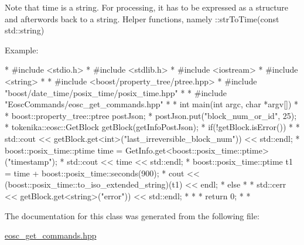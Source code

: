 Note that time is a string. For processing, it has to be expressed as a structure and afterwords back to a string. Helper functions, namely \+::str\+To\+Time(const std\+::string)

Example\+:

\begin{DoxyVerb}* #include <stdio.h>
* #include <stdlib.h>
* #include <iostream>
* #include <string>
* 
* #include <boost/property_tree/ptree.hpp>
* #include "boost/date_time/posix_time/posix_time.hpp"
* 
* #include "EoscCommands/eosc_get_commands.hpp"  
* 
* int main(int argc, char *argv[])
* {
* boost::property_tree::ptree postJson;
* postJson.put("block_num_or_id", 25);
* tokenika::eosc::GetBlock getBlock(getInfoPostJson);
* if(!getBlock.isError())
* {
*    std::cout << getBlock.get<int>("last_irreversible_block_num")) << std::endl;
*    boost::posix_time::ptime time = GetInfo.get<boost::posix_time::ptime>("timestamp");
*    std::cout << time << std::endl;
*    boost::posix_time::ptime t1 = time + boost::posix_time::seconds(900);
*    cout << (boost::posix_time::to_iso_extended_string)(t1) << endl;
* } else
* {
*    std::cerr << getBlock.get<string>("error")) << std::endl;
* }
* 
* return 0;
* }
* \end{DoxyVerb}
 

The documentation for this class was generated from the following file\+:\begin{DoxyCompactItemize}
\item 
\hyperlink{eosc__get__commands_8hpp}{eosc\+\_\+get\+\_\+commands.\+hpp}\end{DoxyCompactItemize}
